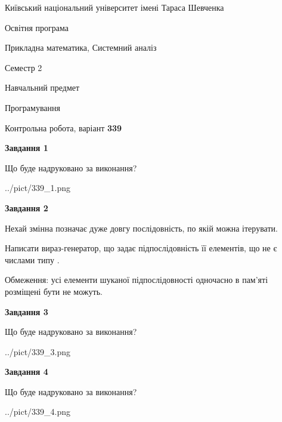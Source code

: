\documentclass[12pt, ukrainian]{article}
\begin{document}
{{\begin {small}\par
{ \center  Київський національний університет імені Тараса Шевченка \par}
{\parbox {5 cm}{Освітня програма \hfill}{\parbox {8 cm}{Прикладна математика, Системний аналіз \hfill}}\parbox {5 cm}{\hfill Семестр 2}}\par
{\parbox {5 cm} {Навчальний предмет \hfill}\parbox {7 cm}{Програмування \hfill}\parbox {6cm}{\hfill}\par}\vspace{-7pt} \end{small}}{\center Контрольна робота, варіант  \No \textbf
{ 339 }\par}}
{
\begin {large}
{\begin {center}\textbf{Завдання 1}\end {center}}\par
Що буде надруковано за виконання?\par\par
\begin{center}
	{../pict/339_1.png}
\end{center}
\newpage

{\begin {center}\textbf{Завдання 2}\end {center}}\par
Нехай змінна  позначає дуже довгу послідовність, по якій можна ітерувати.

Написати вираз-генератор, що задає підпослідовність її елементів, що не є числами типу .

Обмеження: усі елементи шуканої підпослідовності одночасно в пам'яті розміщені бути не можуть.\par
\newpage

{\begin {center}\textbf{Завдання 3}\end {center}}\par
Що буде надруковано за виконання?\par
\begin{center}
	{../pict/339_3.png}
\end{center}
\newpage

{\begin {center}\textbf{Завдання 4}\end {center}}\par
Що буде надруковано за виконання?\par
\begin{center}
	{../pict/339_4.png}
\end{center}
\newpage


\end{large}}
\end{document}
